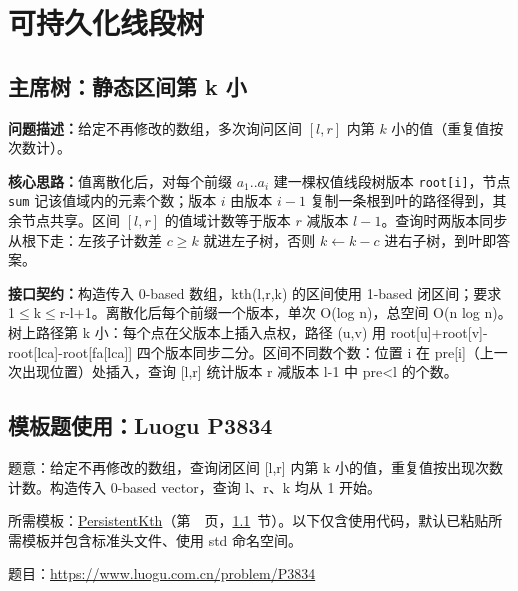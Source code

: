 \section{可持久化线段树}

\subsection{主席树：静态区间第 k 小}\label{compact-PersistentKth}

\noindent\textbf{问题描述：}\allowbreak 给定不再修改的数组，多次询问区间 $[l,r]$ 内第 $k$ 小的值（重复值按次数计）。

\textbf{核心思路：}\allowbreak 值离散化后，对每个前缀 $a_1..a_i$ 建一棵权值线段树版本 \texttt{root[i]}，节点 \texttt{sum} 记该值域内的元素个数；版本 $i$ 由版本 $i-1$ 复制一条根到叶的路径得到，其余节点共享。区间 $[l,r]$ 的值域计数等于版本 $r$ 减版本 $l-1$。查询时两版本同步从根下走：左孩子计数差 $c\ge k$ 就进左子树，否则 $k\leftarrow k-c$ 进右子树，到叶即答案。



{\sloppy{}\noindent\textbf{接口契约：}构造传入 0-based 数组，kth(l,r,k) 的区间使用 1-based 闭区间；要求 1$\le$k$\le$r-l+1。离散化后每个前缀一个版本，单次 O(log n)，总空间 O(n log n)。 树上路径第 k 小：每个点在父版本上插入点权，路径 (u,v) 用 root[u]+root[v]-root[lca]-root[fa[lca]] 四个版本同步二分。区间不同数个数：位置 i 在 pre[i]（上一次出现位置）处插入，查询 [l,r] 统计版本 r 减版本 l-1 中 pre<l 的个数。\par}



\Needspace{342pt}

\subsection*{模板题使用：Luogu P3834}

\label{usage-example-37}

题意：给定不再修改的数组，查询闭区间 [l,r] 内第 k 小的值，重复值按出现次数计数。构造传入 0-based vector，查询 l、r、k 均从 1 开始。

所需模板：\hyperref[compact-PersistentKth]{PersistentKth}（第~\pageref{compact-PersistentKth}~页，\ref{compact-PersistentKth}~节）。以下仅含使用代码，默认已粘贴所需模板并包含标准头文件、使用 std 命名空间。

题目：\url{https://www.luogu.com.cn/problem/P3834}

